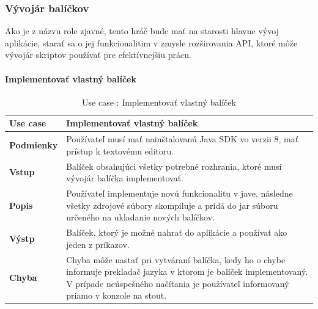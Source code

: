 \subsubsection{Vývojár balíčkov}
\indent Ako je z názvu role zjavné, tento hráč bude mať na starosti hlavne vývoj aplikácie, starať sa o jej funkcionalitim v zmysle rozširovania API, ktoré môže vývojár skriptov používať pre efektívnejšiu prácu.
\paragraph{Implementovať vlastný balíček}
\begin{center}
	\begin{table}[htbp]
		\begin{tabular}{|p{2.5cm}|p{14cm}|}
			\hline
			\textbf{Use case} & Implementovať vlastný balíček \\ 
			\hline
			\textbf{Podmienky} & Používateľ musí mať nainštalovanú Java SDK vo verzii 8, mať prístup k textovému editoru.  \\ 
			\hline
			\textbf{Vstup} & Balíček obsahujúci všetky potrebné rozhrania, ktoré musí vývojár balíčka implementovať.\\
			\hline
			\textbf{Popis} & Používateľ implementuje novú funkcionalitu v jave, následne všetky zdrojové súbory skompiluje a pridá do jar súboru určeného na ukladanie nových balíčkov.\\ 
			\hline
			\textbf{Výstp} & Balíček, ktorý je možné nahrať do aplikácie a používať ako jeden z príkazov.\\
			\hline
			\textbf{Chyba} & Chyba môže nastať pri vytváraní balíčka, kedy ho o chybe informuje prekladač jazyka v ktorom je balíček implementovaný. V prípade neúspešného načítania je používateľ informovaný priamo v konzole na stout.\\
			\hline
		\end{tabular}
		\label{table:1}
		\caption{Use case : Implementovať vlastný balíček}
	\end{table}
\end{center}
\newpage

